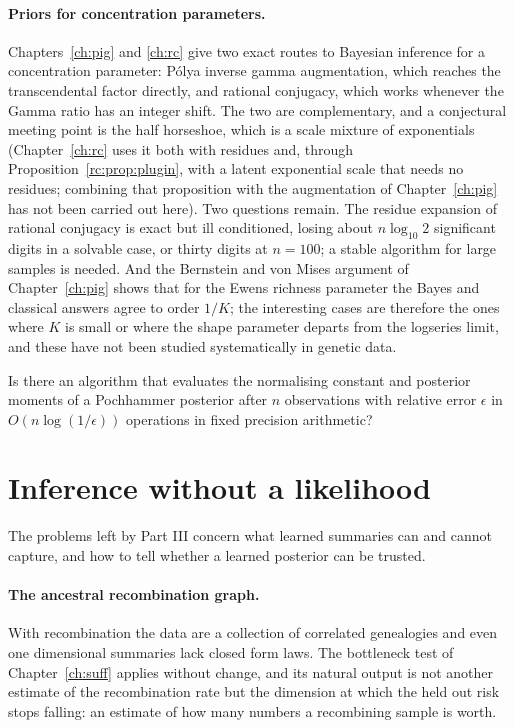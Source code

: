 \paragraph{Priors for concentration parameters.} Chapters~\ref{ch:pig} and \ref{ch:rc} give two
exact routes to Bayesian inference for a concentration parameter: P\'olya inverse gamma
augmentation, which reaches the transcendental factor directly, and rational conjugacy, which works
whenever the Gamma ratio has an integer shift. The two are complementary, and a conjectural meeting point is the half horseshoe, which is a
scale mixture of exponentials (Chapter~\ref{ch:rc} uses it both with residues and, through Proposition~\ref{rc:prop:plugin}, with a latent exponential scale that needs no residues; combining that proposition with the augmentation of Chapter~\ref{ch:pig} has not been carried out here). Two questions remain. The residue expansion of rational conjugacy
is exact but ill conditioned, losing about $n\log_{10}2$ significant digits in a solvable case, or
thirty digits at $n=100$; a stable algorithm for large samples is needed. And the Bernstein and von
Mises argument of Chapter~\ref{ch:pig} shows that for the Ewens richness parameter the Bayes and
classical answers agree to order $1/K$; the interesting cases are therefore the ones where $K$ is
small or where the shape parameter departs from the logseries limit, and these have not been
studied systematically in genetic data.

\begin{question}\label{future:q:stable}
Is there an algorithm that evaluates the normalising constant and posterior moments of a
Pochhammer posterior after $n$ observations with relative error $\epsilon$ in $O(n\log(1/\epsilon))$
operations in fixed precision arithmetic?
\end{question}

\section{Inference without a likelihood}

The problems left by Part III concern what learned summaries can and cannot capture, and how to
tell whether a learned posterior can be trusted.

\paragraph{The ancestral recombination graph.} With recombination the data are a collection of
correlated genealogies and even one dimensional summaries lack closed form laws. The bottleneck
test of Chapter~\ref{ch:suff} applies without change, and its natural output is not another
estimate of the recombination rate but the dimension at which the held out risk stops falling:
an estimate of how many numbers a recombining sample is worth.

